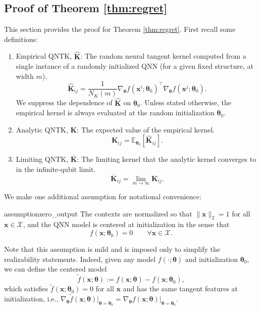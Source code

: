 \documentclass[pdflatex,sn-mathphys-num]{sn-jnl}%
\theoremstyle{thmstyleone}%
\theoremstyle{thmstyletwo}%
\theoremstyle{thmstylethree}%
\newcommand{\E}{\mathbb{E}}
\newcommand{\xbf}{\mathbf{x}}
\newcommand{\Kbf}{\mathbf{K}}
\newcommand{\thetabf}{\bm{\theta}}
\begin{document}
\begin{appendices}

\section{Proof of Theorem \ref{thm:regret}}\label{secA}

This section provides the proof for Theorem \ref{thm:regret}. First recall some definitions:

\begin{enumerate}
    \item Empirical QNTK, $\hat{\Kbf}$: The random neural tangent kernel computed from a single instance of a randomly initialized QNN (for a given fixed structure, at width $m$).
    $$ \hat{\Kbf}_{i j} = \frac{1}{N_K(m)} \nabla_\mathbf{{\thetabf}} f(\xbf^i;\thetabf_0)^\top \nabla_{\thetabf} f(\xbf^j;\thetabf_0). $$ We suppress the dependence of $\hat{\Kbf}$ on $\thetabf_0$. Unless stated otherwise, the empirical kernel is always evaluated at the random initialization $\thetabf_0$.

    
    \item Analytic QNTK, $\Kbf$: The expected value of the empirical kernel.
    $$ \Kbf_{i j} = \E_{\thetabf_0} \left[ \hat{\Kbf}_{i j} \right]. $$
    \item Limiting QNTK, $\bar{\Kbf}$: The limiting kernel that the analytic kernel converges to in the infinite-qubit limit.
    $$ \bar{\Kbf}_{i j} = \lim_{m\to\infty} \Kbf_{i j}. $$
\end{enumerate}


\noindent We make one additional assumption for notational convenience:

\begin{restatable}{assumption}{zero_output}\label{ass:zero_output}
The contexts are normalized so that $\|\xbf\|_2=1$ for all $\xbf\in\mathcal X$, and the QNN model is centered at initialization in the sense that
\begin{equation}\label{eq:zero_output}
f(\xbf;\thetabf_0)=0 \qquad \forall \xbf\in\mathcal X.
\end{equation}
\end{restatable}

Note that this assumption is mild and is imposed only to simplify the realizability statements. Indeed, given any model $f(\cdot;\thetabf)$ and initialization $\thetabf_0$, we can define the centered model
\[
\widetilde f(\xbf;\thetabf) := f(\xbf;\thetabf) - f(\xbf;\thetabf_0),
\]
which satisfies $\widetilde f(\xbf;\thetabf_0)=0$ for all $\xbf$ and has the same tangent features at initialization, i.e.,
$\nabla_{\thetabf}\widetilde f(\xbf;\thetabf)\big|_{\thetabf=\thetabf_0}
=
\nabla_{\thetabf} f(\xbf;\thetabf)\big|_{\thetabf=\thetabf_0}$.





\end{appendices}
\end{document}
